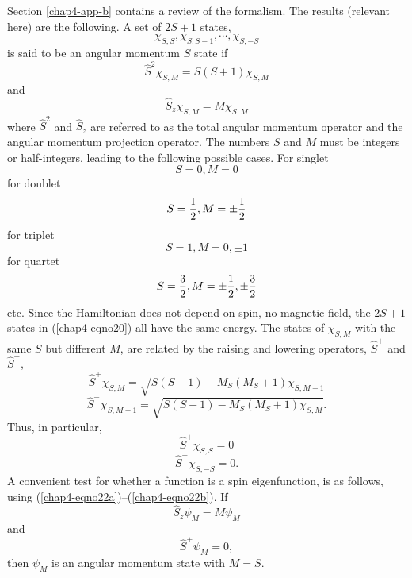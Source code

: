 Section \ref{chap4-app-b} contains a review of the formalism. The
results (relevant here) are the following.  A set of $2S + 1$ states,
\begin{equation}
\chi_{S,S} , \chi_{S,S-1} , \cdots , \chi_{S,-S}
\label{chap4-eqno20}
\end{equation}
is said to be an angular momentum $S$ state if
\begin{equation}
\hat{S}^2 \chi_{S,M} = S(S + 1) \chi_{S,M}
\end{equation}
and
\begin{equation}
\hat{S}_z \chi_{S,M} = M \chi_{S,M}
\end{equation}
where $\hat{S}^2$ and $\hat{S}_z$ are referred to as the total angular 
momentum operator and the angular momentum projection operator.  The 
numbers $S$ and $M$  must be integers or half-integers, leading to the 
following possible cases.  For singlet
\begin{equation}
S = 0 , M = 0
\end{equation}
for doublet
\begin{equation}
S = {1 \over 2} , M = \pm {1 \over 2}
\end{equation}
for triplet
\begin{equation}
S = 1 , M = 0, \pm 1
\end{equation}
for quartet
\begin{equation}
S = {3 \over 2} , M = \pm {1 \over 2} , \pm {3 \over 2}
\end{equation}
etc.  Since the Hamiltonian does not depend on spin, no magnetic
field, the $2S +1$ states in (\ref{chap4-eqno20}) all have the same
energy.  The states of $\chi_{S,M}$ with the same $S$ but different
$M$, are related by the raising and lowering operators, $\hat{S}^+$
and $\hat{S}^-$,
\begin{equation}
\hat{S}^+ \chi_{S,M} = \sqrt{S(S+1) - M_S (M_S + 1) \chi_{S,M+1}}
\label{chap4-eqno21a}
\end{equation}
\begin{equation}
\hat{S}^- \chi_{S,M+1} = \sqrt{S(S+1) - M_S (M_S + 1) \chi_{S,M}}.
\label{chap4-eqno21b}
\end{equation}
Thus, in particular,
\begin{equation}
\hat{S}^+ \chi_{S,S} = 0
\label{chap4-eqno22a}
\end{equation}
\begin{equation}
\hat{S}^- \chi_{S,-S} = 0.
\label{chap4-eqno22b}
\end{equation}
A convenient test for whether a function is a spin eigenfunction, is
as follows, using (\ref{chap4-eqno22a})--(\ref{chap4-eqno22b}).  If
\begin{equation}
\hat{S}_z \psi_M = M \psi_M
\end{equation}
and
\begin{equation}
\hat{S}^+ \psi_M = 0,
\end{equation}
then $\psi_M$ is an angular momentum state with $M = S$.

